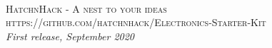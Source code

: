 
\begingroup
\thispagestyle{empty}
\centering
\vspace*{5cm}
\par\normalfont\fontsize{35}{35}\sffamily\selectfont
\vspace*{1cm}
\endgroup


\newpage
~\vfill
\thispagestyle{empty}


\noindent \textsc{HatchnHack - A nest to your ideas}\\

\noindent \textsc{https://github.com/hatchnhack/Electronics-Starter-Kit}\\ %

\noindent \textit{First release, September 2020} %